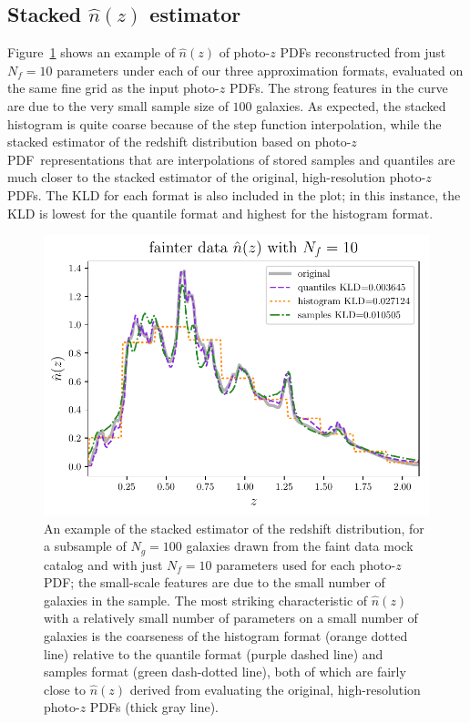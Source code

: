 \documentclass[\docopts]{\docclass}
\newcommand{\pz}{photo-$z$ PDF}
\newcommand{\ssdata}{faint\xspace}
\begin{document}
\subsection{Stacked $\hat{n}(z)$ estimator}
\label{sec:stacked_results}

Figure~\ref{fig:stacked} shows an example of $\hat{n}(z)$ of \pz s 
reconstructed from just $N_{f}=10$ parameters under each of our three 
approximation formats, evaluated on the same fine grid as the input \pz s.
The strong features in the curve are due to the very small sample size of $100$ 
galaxies.
As expected, the stacked histogram is quite coarse because of the step function 
interpolation, while the stacked estimator of the redshift distribution based 
on \pz\ representations that are interpolations of stored samples and quantiles 
are much closer to the stacked estimator of the original, high-resolution \pz s.
The KLD for each format is also included in the plot; in this instance, the KLD 
is lowest for the quantile format and highest for the histogram format.

\begin{figure}
  \begin{center}
    \includegraphics[width=\columnwidth]{figures/stacked.pdf}
    \caption{An example of the stacked estimator of the redshift distribution, 
for a subsample of $N_{g}=100$ galaxies drawn from the \ssdata data mock 
catalog and with just $N_{f}=10$ parameters used for each \pz; the small-scale 
features are due to the small number of galaxies in the sample.
    The most striking characteristic of $\hat{n}(z)$ with a relatively small 
number of parameters on a small number of galaxies is the coarseness of the 
histogram format (orange dotted line) relative to the quantile format (purple 
dashed line) and samples format (green dash-dotted line), both of which are 
fairly close to $\hat{n}(z)$ derived from evaluating the original, 
high-resolution \pz s (thick gray line).
    \label{fig:stacked}}
  \end{center}
\end{figure}
\end{document}
